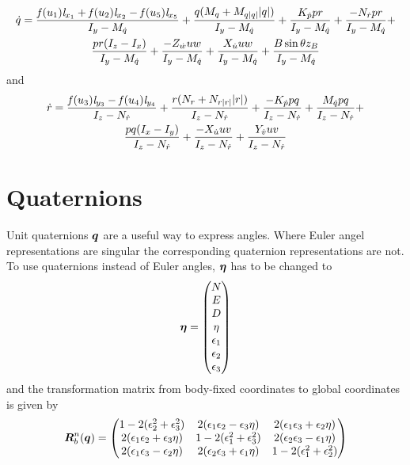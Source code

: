 \begin{multline} \label{eq:q_dot}
\dot{q} =\frac{\mathit{f}(u_{1}) \mathit{l}_{x_{1}} + \mathit{f}(u_{2}) \mathit{l}_{x_{2}} - \mathit{f}(u_{5}) \mathit{l}_{x_{5}}}{I_{y} - M_{\dot{q}}} + \frac{q (M_{q} + M_{q|q|} |q|)}{I_{y} - M_{\dot{q}}} + \frac{K_{\dot{p}} p r}{I_{y} - M_{\dot{q}}} + \frac{-N_{\dot{r}} p r}{I_{y} - M_{\dot{q}}} +\\
\frac{p r (I_{z} - I_{x})}{I_{y} - M_{\dot{q}}} + \frac{-Z_{\dot{w}} u w}{I_{y} - M_{\dot{q}}} + \frac{X_{\dot{u}} u w}{I_{y} - M_{\dot{q}}} + \frac{B \sin{\theta} z_B}{I_{y} - M_{\dot{q}}} 
\end{multline} and 
\begin{multline} \label{eq:r_dot}
\dot{r} = \frac{\mathit{f}(u_{3}) \mathit{l}_{y_{3}} - \mathit{f}(u_{4}) \mathit{l}_{y_{4}}}{I_{z} - N_{\dot{r}}} + \frac{r (N_{r} + N_{r|r|} |r|)}{I_{z} - N_{\dot{r}}} + \frac{-K_{\dot{p}} p q}{I_{z} - N_{\dot{r}}} + \frac{M_{\dot{q}} p q}{I_{z} - N_{\dot{r}}} +\\
\frac{p q (I_{x} - I_{y})}{I_{z} - N_{\dot{r}}} + \frac{- X_{\dot{u}} u v}{I_{z} - N_{\dot{r}}} + \frac{Y_{\dot{v}} u v}{I_{z} - N_{\dot{r}}}
\end{multline} 

\section{Quaternions}  
Unit quaternions $\boldsymbol{q}$ are a useful way to express angles. Where Euler angel representations are singular the corresponding quaternion representations are not. To use quaternions instead of Euler angles, $\boldsymbol{\eta}$ has to be changed to 
\begin{equation}
\boldsymbol{\eta} = \begin{pmatrix}
N \\
E \\
D \\
\eta \\
\epsilon_1 \\
\epsilon_2 \\
\epsilon_3 \\
\end{pmatrix}
\end{equation}
and the transformation matrix from body-fixed coordinates to global coordinates is given by 
\begin{equation}
\boldsymbol{R}^n_b(\boldsymbol{q}) = \begin{pmatrix}
  1 - 2(\epsilon_2^2 + \epsilon_3^2) & 2(\epsilon_1\epsilon_2 - \epsilon_3\eta)   & 2(\epsilon_1\epsilon_3 + \epsilon_2\eta) \\
     2(\epsilon_1\epsilon_2 + \epsilon_3\eta) &  1-2(\epsilon_1^2 + \epsilon_3^2) & 2(\epsilon_2\epsilon_3-\epsilon_1\eta)    \\
     2(\epsilon_1\epsilon_3 - \epsilon_2\eta) &  2(\epsilon_2\epsilon_3 + \epsilon_1\eta)  & 1-2(\epsilon_1^2 + \epsilon_2^2) \\
\end{pmatrix}
\end{equation}

